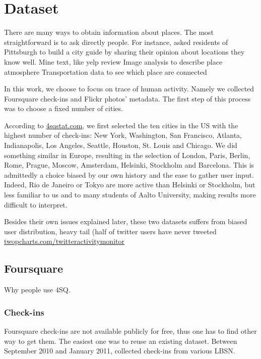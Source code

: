 \chapter{Dataset}
\label{chap:dataset}

There are many ways to obtain information about places. The most
straightforward is to ask directly people. For instance, \textcite{Curated14}
 asked residents of Pittsburgh to build a city
guide by sharing their opinion about locations they know well.
Mine text, like yelp review \autocite{YelpReview14}
Image analysis to describe place atmosphere
Transportation data to see which place are connected

In this work, we choose to focus on trace of human activity. Namely we
collected Foursquare check-ins and Flickr photos' metadata. The first step of
this process was to choose a fixed number of cities.

According to \href{http://www.4sqstat.com/}{4sqstat.com}, we first selected
the ten cities in the US with the highest number of check-ins: New York,
Washington, San Francisco, Atlanta, Indianapolis, Los Angeles, Seattle,
Houston, St. Louis and Chicago. We did something similar in Europe,
resulting in the selection of London, Paris, Berlin, Rome, Prague, Moscow,
Amsterdam, Helsinki, Stockholm and Barcelona. This is admittedly a choice
biased by our own history and the ease to gather user input. Indeed, Rio
de Janeiro or Tokyo are more active than Helsinki or Stockholm, but less
familiar to us and to many students of Aalto University, making results more
difficult to interpret.

Besides their own issues explained later, these two datasets suffers from
biased user distribution\autocite{Weird10}, heavy tail (half of twitter users
have never tweeted \href{http://twopcharts.com/twitteractivitymonitor}%
{\url{twopcharts.com/twitteractivitymonitor}}

\section{Foursquare}

Why people use 4SQ\autocite{FSMotivation11}.

\subsection{Check-ins}

Foursquare check-ins are not available publicly for free, thus one has to
find other way to get them. The easiest one was to reuse an existing dataset.
Between September 2010 and January 2011, \textcite{dataset11} collected
 check-ins  from various LBSN.

